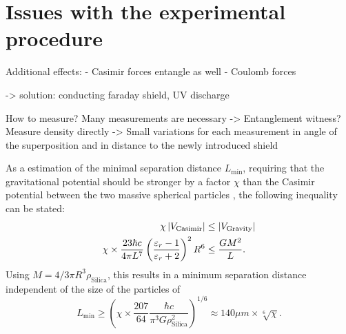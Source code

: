 \section{Issues with the experimental procedure}\label{sec:2:experimental-problems}

Additional effects:
- Casimir forces entangle as well
- Coulomb forces

-> solution: conducting faraday shield, UV discharge \cite{Kamp_2020}

How to measure? Many measurements are necessary -> Entanglement witness? Measure density directly -> Small variations for each measurement in angle of the superposition and in distance to the newly introduced shield

As a estimation of the minimal separation distance $L_\mathrm{min}$, requiring that the gravitational potential should be stronger by a factor $\chi$ than the Casimir potential between the two massive spherical particles \cite{Emig_2007}, the following inequality can be stated:
\begin{align}
  \chi \left\lvert V_\mathrm{Casimir}\right\rvert &\leq \left\lvert V_\mathrm{Gravity}\right\rvert \\
  \chi \times \frac{23 \hbar c}{4 \pi L^7} \left(\frac{\varepsilon_r - 1}{\varepsilon_r + 2}\right)^2 R^6 &\leq  \frac{G M^2}{L}.
\end{align}
Using $M = 4/3 \pi R^3\rho_\mathrm{Silica}$, this results in a minimum separation distance independent of the size of the particles of
\begin{equation}
  L_\mathrm{min} \geq \left(\chi \times \frac{207}{64} \frac{\hbar c}{\pi^3 G \rho_\mathrm{Silica}^2}\right)^{1/6} \approx 140\si{\mu m} \times \sqrt[6]{\chi} .
\end{equation}
